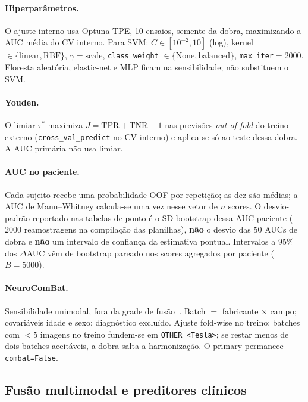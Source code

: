 \documentclass[review]{elsarticle}
\newcommand{\code}[1]{\texttt{#1}}
\begin{document}
	\paragraph{Hiperparâmetros.}
	O ajuste interno usa Optuna TPE, 10 ensaios, semente da dobra, maximizando a AUC média do CV interno.
	Para SVM: $C\in[10^{-2},10]$ (log), kernel $\in\{\mathrm{linear},\mathrm{RBF}\}$, $\gamma=\mathrm{scale}$, \code{class\_weight} $\in\{\mathrm{None},\mathrm{balanced}\}$, \code{max\_iter}$=2000$.
	Floresta aleatória, elastic-net e MLP ficam na sensibilidade; não substituem o SVM.
	
	\paragraph{Youden.}
	O limiar $\tau^{*}$ maximiza $J=\mathrm{TPR}+\mathrm{TNR}-1$ nas previsões \emph{out-of-fold} do treino externo (\code{cross\_val\_predict} no CV interno) e aplica-se só ao teste dessa dobra.
	A AUC primária não usa limiar.
	
	\paragraph{AUC no paciente.}
	Cada sujeito recebe uma probabilidade OOF por repetição; as dez são médias; a AUC de Mann--Whitney calcula-se uma vez nesse vetor de $n$ scores.
	O desvio-padrão reportado nas tabelas de ponto é o SD bootstrap dessa AUC paciente ($2000$ reamostragens na compilação das planilhas), \textbf{não} o desvio das 50 AUCs de dobra e \textbf{não} um intervalo de confiança da estimativa pontual.
	Intervalos a 95\% dos $\Delta$AUC vêm de bootstrap pareado nos scores agregados por paciente ($B=5000$).
	
	\paragraph{NeuroComBat.}
	Sensibilidade unimodal, fora da grade de fusão~\cite{fortin-2018}.
	Batch $=$ fabricante $\times$ campo; covariáveis idade e sexo; diagnóstico excluído.
	Ajuste fold-wise no treino; batches com $<5$ imagens no treino fundem-se em \code{OTHER\_<Tesla>}; se restar menos de dois batches aceitáveis, a dobra salta a harmonização.
	O primary permanece \code{combat=False}.
	
	\subsection{Fusão multimodal e preditores clínicos}
	\label{sec:fusao}
	
\end{document}
